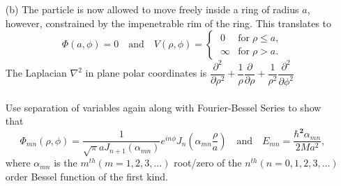 \documentclass{article}
\begin{document}
{\begin{enumerate}
		\[
			i\hbar \frac{1}{\phi} \frac{\partial \phi}{\partial t} = \frac{1}{\Phi}\left[ -\frac{\hbar^2}{2M} \nabla^2 \Phi + V(x, y, z) \Phi \right]
		\]
		Now the left side is a function of $t$ alone, and the right side is a function of the spatial coordinates alone. In general, this situation means that both sides are constant. This is where $E$, the separation constant, comes in.
		\[
			\frac{1}{\Phi}\left[ -\frac{\hbar^2}{2M} \nabla^2 \Phi + V(x, y, z) \Phi \right] = E	
		\]
		\[
			\left[ -\frac{\hbar^2}{2M} \nabla^2 + V(x, y, z)  \right] \Phi(x, y, z) = E\Phi(x, y, z)
		\]
		\[
			i\hbar \frac{1}{\phi} \frac{\partial \phi}{\partial t} = E
		\]
		\[
			\frac{d \phi}{dt} = -\frac{iE}{\hbar} \phi
		\]
		\[
			\int \frac{d\phi}{\phi} =  \int -\frac{iE}{\hbar} \, dt
		\]
		\[
			\phi(t) = C e^{-\dfrac{iE}{\hbar} t}
		\]
		Finally, with the condition of separation of variables,
		\[
			\Psi(x, y, z, t) = C e^{-\dfrac{iE}{\hbar} t} \Phi(x, y, z)	
		\]
	\boldmath
		\item[(b)] The particle is now allowed to move freely inside a ring of radius $a$, however, constrained by the impenetrable rim of the ring. This translates to
		\[
			\Phi(a, \phi) = 0 \quad \text{and} \quad V(\rho, \phi) = \begin{cases}
				\; 0 & \text{for} \; \rho \leq a, \\
				\; \infty & \text{for} \; \rho > a.
			\end{cases}
		\]
		The Laplacian $\nabla^2$ in plane polar coordinates is $\dfrac{\partial^2}{\partial \rho^2} + \dfrac{1}{\rho} \dfrac{\partial}{\partial \rho} + \dfrac{1}{\rho^2} \dfrac{\partial^2}{\partial \phi^2}$ \\\\
		Use separation of variables again along with Fourier-Bessel Series to show that
		\[
			\Phi_{mn}(\rho, \phi) = \frac{1}{\sqrt{\pi} a J_{n+1} \left( \alpha_{mn} \right)} e^{in\phi} J_n\left( \alpha_{mn} \frac{\rho}{a} \right) \quad \text{and} \quad E_{mn} = \frac{\bm{\hbar^2} \alpha_{mn}}{2 M a^2},
		\]
		where $\alpha_{mn}$ is the $m^{th} \left( m = 1,2,3,\ldots \right)$ root/zero of the $n^{th} \left( n=0,1,2,3,\ldots \right)$ order Bessel function of the first kind.
	\unboldmath

\end{enumerate}}
\end{document}

